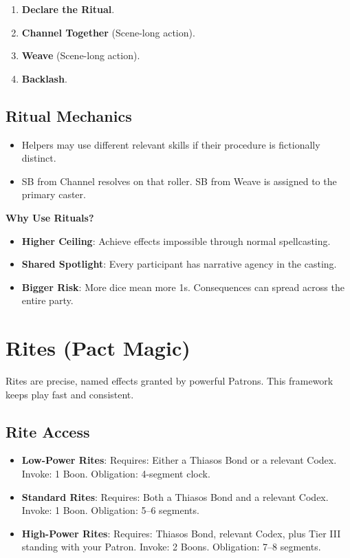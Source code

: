 \begin{enumerate}
    \item \textbf{Declare the Ritual}.
    \item \textbf{Channel Together} (Scene-long action).
    \item \textbf{Weave} (Scene-long action).
    \item \textbf{Backlash}.
\end{enumerate}

\subsection*{Ritual Mechanics}

\begin{itemize}
    \item Helpers may use different relevant skills if their procedure is fictionally distinct.
    \item SB from Channel resolves on that roller. SB from Weave is assigned to the primary caster.
\end{itemize}

\textbf{Why Use Rituals?}

\begin{itemize}
    \item \textbf{Higher Ceiling}: Achieve effects impossible through normal spellcasting.
    \item \textbf{Shared Spotlight}: Every participant has narrative agency in the casting.
    \item \textbf{Bigger Risk}: More dice mean more 1s. Consequences can spread across the entire party.
\end{itemize}

\section*{Rites (Pact Magic)}

Rites are precise, named effects granted by powerful Patrons. This framework keeps play fast and consistent.

\subsection*{Rite Access}

\begin{itemize}
    \item \textbf{Low-Power Rites}: Requires: Either a Thiasos Bond or a relevant Codex. Invoke: 1 Boon. Obligation: 4-segment clock.
    \item \textbf{Standard Rites}: Requires: Both a Thiasos Bond and a relevant Codex. Invoke: 1 Boon. Obligation: 5--6 segments.
    \item \textbf{High-Power Rites}: Requires: Thiasos Bond, relevant Codex, plus Tier III standing with your Patron. Invoke: 2 Boons. Obligation: 7--8 segments.
\end{itemize}

